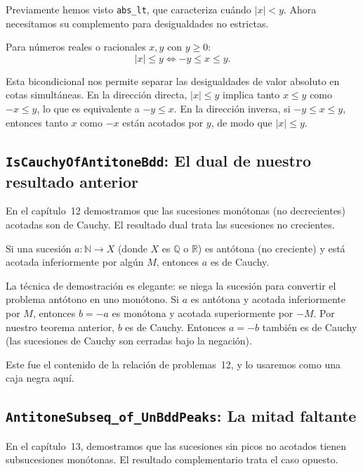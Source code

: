 Previamente hemos visto \texttt{abs\_lt}, que caracteriza cuándo
$|x| < y$. Ahora necesitamos su complemento para desigualdades no
estrictas.

\begin{theorem}
  Para números reales o racionales $x, y$ con $y \geq 0$:
  \[
    |x| \leq y \iff -y \leq x \leq y.
  \]
\end{theorem}

Esta bicondicional nos permite separar las desigualdades de valor
absoluto en cotas simultáneas. En la dirección directa, $|x| \leq y$
implica tanto $x \leq y$ como $-x \leq y$, lo que es equivalente a
$-y \leq x$. En la dirección inversa, si $-y \leq x \leq y$, entonces
tanto $x$ como $-x$ están acotados por $y$, de modo que $|x| \leq y$.

\subsection{\texttt{IsCauchyOfAntitoneBdd}: El dual de nuestro resultado anterior}

En el capítulo~12 demostramos que las sucesiones monótonas
(no decrecientes) acotadas son de Cauchy. El resultado dual trata las
sucesiones no crecientes.

\begin{theorem}
  Si una sucesión $a : \mathbb{N} \to X$ (donde $X$ es $\mathbb{Q}$ o
  $\mathbb{R}$) es antótona (no creciente) y está acotada inferiormente
  por algún $M$, entonces $a$ es de Cauchy.
\end{theorem}

La técnica de demostración es elegante: se niega la sucesión para
convertir el problema antótono en uno monótono. Si $a$ es antótona y
acotada inferiormente por $M$, entonces $b = -a$ es monótona y acotada
superiormente por $-M$. Por nuestro teorema anterior, $b$ es de Cauchy.
Entonces $a = -b$ también es de Cauchy (las sucesiones de Cauchy son
cerradas bajo la negación).

Este fue el contenido de la relación de problemas~12, y lo usaremos como
una caja negra aquí.

\subsection{\texttt{AntitoneSubseq\_of\_UnBddPeaks}: La mitad faltante}

En el capítulo~13, demostramos que las sucesiones sin picos no
acotados tienen subsucesiones monótonas. El resultado complementario
trata el caso opuesto.

